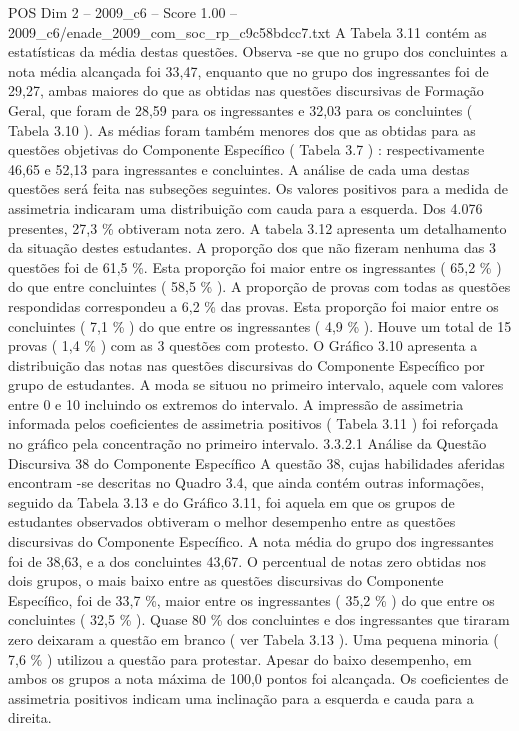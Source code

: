 \begin{textsample}{POS Dim 2 – 2009\_c6 – Score 1.00 – 2009\_c6/enade\_2009\_com\_soc\_rp\_c9c58bdcc7.txt}
A Tabela 3.11 contém as estatísticas da média destas questões.
Observa -se que no grupo dos concluintes a nota média alcançada foi 33,47, enquanto que no grupo dos ingressantes foi de 29,27, ambas maiores do que as obtidas nas questões discursivas de Formação Geral, que foram de 28,59 para os ingressantes e 32,03 para os concluintes ( Tabela 3.10 ).
As médias foram também menores dos que as obtidas para as questões objetivas do Componente Específico ( Tabela 3.7 ) : respectivamente 46,65 e 52,13 para ingressantes e concluintes.
A análise de cada uma destas questões será feita nas subseções seguintes.
Os valores positivos para a medida de assimetria indicaram uma distribuição com cauda para a esquerda.
Dos 4.076 presentes, 27,3 \% obtiveram nota zero.
A tabela 3.12 apresenta um detalhamento da situação destes estudantes.
A proporção dos que não fizeram nenhuma das 3 questões foi de 61,5 \%.
Esta proporção foi maior entre os ingressantes ( 65,2 \% ) do que entre concluintes ( 58,5 \% ).
A proporção de provas com todas as questões respondidas correspondeu a 6,2 \% das provas.
Esta proporção foi maior entre os concluintes ( 7,1 \% ) do que entre os ingressantes ( 4,9 \% ).
Houve um total de 15 provas ( 1,4 \% ) com as 3 questões com protesto.
O Gráfico 3.10 apresenta a distribuição das notas nas questões discursivas do Componente Específico por grupo de estudantes.
A moda se situou no primeiro intervalo, aquele com valores entre 0 e 10 incluindo os extremos do intervalo.
A impressão de assimetria informada pelos coeficientes de assimetria positivos ( Tabela 3.11 ) foi reforçada no gráfico pela concentração no primeiro intervalo. 3.3.2.1 Análise da Questão Discursiva 38 do Componente Específico A questão 38, cujas habilidades aferidas encontram -se descritas no Quadro 3.4, que ainda contém outras informações, seguido da Tabela 3.13 e do Gráfico 3.11, foi aquela em que os grupos de estudantes observados obtiveram o melhor desempenho entre as questões discursivas do Componente Específico.
A nota média do grupo dos ingressantes foi de 38,63, e a dos concluintes 43,67.
O percentual de notas zero obtidas nos dois grupos, o mais baixo entre as questões discursivas do Componente Específico, foi de 33,7 \%, maior entre os ingressantes ( 35,2 \% ) do que entre os concluintes ( 32,5 \% ).
Quase 80 \% dos concluintes e dos ingressantes que tiraram zero deixaram a questão em branco ( ver Tabela 3.13 ).
Uma pequena minoria ( 7,6 \% ) utilizou a questão para protestar.
Apesar do baixo desempenho, em ambos os grupos a nota máxima de 100,0 pontos foi alcançada.
Os coeficientes de assimetria positivos indicam uma inclinação para a esquerda e cauda para a direita.

\end{textsample}
